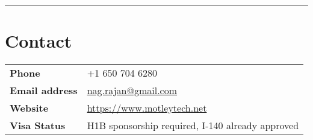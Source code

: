 \documentclass[line, 11pt]{res}
\renewenvironment{resume}{\begingroup}{\endgroup}
\begin{document}
\begin{resume}
\vspace{8pt}
\hrule


\vspace{-3pt}
\section{Contact}
    \vspace{5pt}
    \begin{tabular}{ll}
    \textbf{Phone} & +1 650 704 6280\\
    \textbf{Email address} & \href{mailto:nag.rajan@gmail.com}{nag.rajan@gmail.com}\\
    \textbf{Website} & \href{https://www.motleytech.net}{https://www.motleytech.net}\\
    \textbf{Visa Status} & H1B sponsorship required, I-140 already approved\\
    \end{tabular}


\end{resume}
\end{document}
